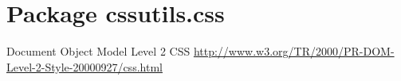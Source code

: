 %
%
%


\section{Package cssutils.css}

    \label{cssutils:css}

Document Object Model Level 2 CSS
\href{http://www.w3.org/TR/2000/PR-DOM-Level-2-Style-20000927/css.html}{http://www.w3.org/TR/2000/PR-DOM-Level-2-Style-20000927/css.html}
